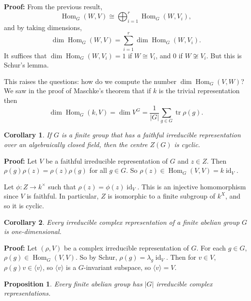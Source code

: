\documentclass[12pt]{article}
\DeclareMathOperator{\tr}{tr}
\DeclareMathOperator{\id}{id}
\DeclareMathOperator{\Hom}{Hom}
\newtheorem{corollary}{Corollary}[section]
\newtheorem{proposition}{Proposition}[section]
\theoremstyle{definition}
\theoremstyle{remark}
\begin{document}
\begin{adjustbox}{minipage = \columnwidth - 25.5pt, margin=1em, frame=1pt, margin=0em}
\textbf{Proof:} From the previous result,
\[
	\Hom_G(W, V) \cong \bigoplus_{i = 1}^{r} \Hom_G(W, V_i)
,\]
and by taking dimensions,
\[
	\dim \Hom_G(W, V) = \sum_{i = 1}^{r} \dim \Hom_G(W, V_i)
.\]
It suffices that $\dim \Hom_G(W, V_i) = 1$ if $W \cong V_i$, and $0$ if $W \not \cong V_i$. But this is Schur's lemma.
\end{adjustbox}

This raises the questions: how do we compute the number $\dim \Hom_G(V, W)$? We saw in the proof of Maschke's theorem that if $k$ is the trivial representation then
\[
	\dim \Hom_G(k, V) = \dim V^{G} = \frac{1}{|G|} \sum_{g \in G}\tr \rho(g)
.\]

\begin{corollary}
	If $G$ is a finite group that has a faithful irreducible representation over an algebraically closed field, then the centre $Z(G)$ is cyclic.
\end{corollary}

\begin{adjustbox}{minipage = \columnwidth - 25.5pt, margin=1em, frame=1pt, margin=0em}
	\textbf{Proof:} Let $V$ be a faithful irreducible representation of $G$ and $z \in Z$. Then $\rho(g) \rho(z) = \rho(z) \rho(g)$ for all $g \in G$. So $\rho(z) \in \Hom_G(V, V) = k \id_V$. 

	Let  $\phi : Z \to k^{\times}$ such that $\rho(z) = \phi(z) \id_V$. This is an injective homomorphism since $V$ is faithful. In particular, $Z$ is isomorphic to a finite subgroup of $k^{X}$, and so it is cyclic.
\end{adjustbox}

\begin{corollary}
	Every irreducible complex representation of a finite abelian group $G$ is one-dimensional.
\end{corollary}

\begin{adjustbox}{minipage = \columnwidth - 25.5pt, margin=1em, frame=1pt, margin=0em}
	\textbf{Proof:} Let $(\rho, V)$ be a complex irreducible representation of $G$. For each $g \in G$, $\rho(g) \in \Hom_G(V, V)$. So by Schur, $\rho(g) = \lambda_g \id_V$. Then for $v \in V$, $\rho(g)v \in \langle v \rangle$, so $\langle v \rangle$ is a $G$-invariant subspace, so $\langle v \rangle = V$.
\end{adjustbox}

\begin{proposition}
	Every finite abelian group has $|G|$ irreducible complex representations.
\end{proposition}
\end{document}
